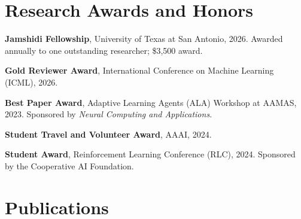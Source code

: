 \documentclass[letterpaper,11pt]{article}
\begin{document}


\section*{Research Awards and Honors}
\begin{cvlist}
    \item \textbf{Jamshidi Fellowship}, University of Texas at San Antonio, 2026. Awarded annually to one outstanding researcher; \$3,500 award.
    \item \textbf{Gold Reviewer Award}, International Conference on Machine Learning (ICML), 2026.
    \item \textbf{Best Paper Award}, Adaptive Learning Agents (ALA) Workshop at AAMAS, 2023. Sponsored by \textit{Neural Computing and Applications}.
    \item \textbf{Student Travel and Volunteer Award}, AAAI, 2024.
    \item \textbf{Student Award}, Reinforcement Learning Conference (RLC), 2024. Sponsored by the Cooperative AI Foundation.
\end{cvlist}


\section*{Publications}
\end{document}
